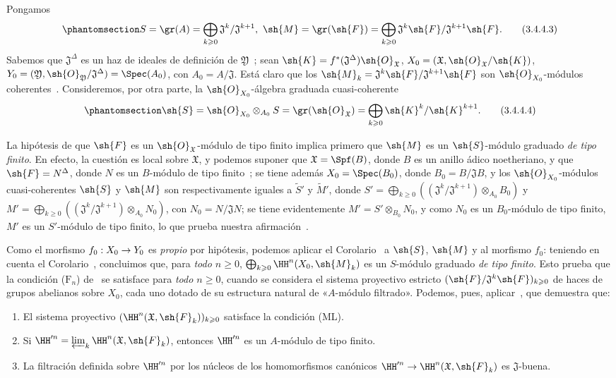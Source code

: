 \documentclass[oneside]{amsart}
\makeatletter
\renewcommand{\geq}{\geqslant}
\newcommand{\ega@arrow}[2]{\mathchoice{#1}{#2}{#2}{#2}}
\renewcommand{\to}{\ega@arrow{\longrightarrow}{\rightarrow}}
\newcommand{\oldpage}[2][]{{\marginnote{\normalfont\textbf{#1}~|~#2}}\ignorespaces}
\let\EGAOriginalLabel\label
\renewcommand{\label}[1]{\phantomsection\EGAOriginalLabel{#1}}
\makeatother
\begin{document}
Pongamos
\[
\label{III.3.4.4.3}
  S=\gr(A)=\bigoplus_{k\geq 0}\mathfrak{J}^k/\mathfrak{J}^{k+1},\ \sh{M}=\gr(\sh{F})=\bigoplus_{k\geq 0}\mathfrak{J}^k\sh{F}/\mathfrak{J}^{k+1}\sh{F}. \tag{3.4.4.3}
\]
Sabemos que $\mathfrak{J}^\Delta$ es un haz de ideales de definición de $\mathfrak{Y}$~; sean $\sh{K}=f^*(\mathfrak{J}^\Delta)\sh{O}_\mathfrak{X}$, $X_0=(\mathfrak{X},\sh{O}_\mathfrak{X}/\sh{K})$, $Y_0=(\mathfrak{Y},\sh{O}_\mathfrak{Y}/\mathfrak{J}^\Delta)=\Spec(A_0)$, con $A_0=A/\mathfrak{J}$.
Está claro que los $\sh{M}_k=\mathfrak{J}^k\sh{F}/\mathfrak{J}^{k+1}\sh{F}$ son $\sh{O}_{X_0}$-módulos coherentes~.
Consideremos, por otra parte, la $\sh{O}_{X_0}$-álgebra graduada cuasi-coherente
\[
\label{III.3.4.4.4}
  \sh{S}=\sh{O}_{X_0}\otimes_{A_0}S=\gr(\sh{O}_\mathfrak{X})=\bigoplus_{k\geq 0}\sh{K}^k/\sh{K}^{k+1}.
  \tag{3.4.4.4}
\]

La hipótesis de que $\sh{F}$ es un $\sh{O}_\mathfrak{X}$-módulo de tipo finito implica primero que $\sh{M}$ es
\oldpage[III]{121}
un $\sh{S}$-módulo graduado \emph{de tipo finito}.
En efecto, la cuestión es local sobre $\mathfrak{X}$, y podemos suponer que $\mathfrak{X}=\Spf(B)$, donde $B$ es un anillo ádico noetheriano, y que $\sh{F}=N^\Delta$, donde $N$ es un $B$-módulo de tipo finito~; se tiene además $X_0=\Spec(B_0)$, donde $B_0=B/\mathfrak{J}B$, y los $\sh{O}_{X_0}$-módulos cuasi-coherentes $\sh{S}$ y $\sh{M}$ son respectivamente iguales a $\widetilde S'$ y $\widetilde M'$, donde $S'=\bigoplus_{k\geq 0}((\mathfrak{J}^k/\mathfrak{J}^{k+1})\otimes_{A_0}B_0)$ y $M'=\bigoplus_{k\geq 0}((\mathfrak{J}^k/\mathfrak{J}^{k+1})\otimes_{A_0}N_0)$, con $N_0=N/\mathfrak{J}N$; se tiene evidentemente $M'=S'\otimes_{B_0}N_0$, y como $N_0$ es un $B_0$-módulo de tipo finito, $M'$ es un $S'$-módulo de tipo finito, lo que prueba nuestra afirmación~.

Como el morfismo $f_0:X_0\to Y_0$ es \emph{propio} por hipótesis, podemos aplicar el Corolario~ a $\sh{S}$, $\sh{M}$ y al morfismo $f_0$: teniendo en cuenta el Corolario~, concluimos que, para \emph{todo $n\geq 0$}, $\bigoplus_{k\geq 0}\HH^n(X_0,\sh{M}_k)$ es un $S$-módulo graduado \emph{de tipo finito}.
Esto prueba que la condición ($\text{F}_n$) de~ se satisface para \emph{todo $n\geq 0$}, cuando se considera el sistema proyectivo estricto $(\sh{F}/\mathfrak{J}^k\sh{F})_{k\geq 0}$ de haces de grupos abelianos sobre $X_0$, cada uno dotado de su estructura natural de «$A$-módulo filtrado».
Podemos, pues, aplicar~, que demuestra que:
\begin{enumerate}
  \item[1.º] El sistema proyectivo $(\HH^n(\mathfrak{X},\sh{F}_k))_{k\geq 0}$ satisface la condición (ML).
  \item[2.º] Si $\HH^{\prime n}=\varprojlim_k\HH^n(\mathfrak{X},\sh{F}_k)$, entonces $\HH^{\prime n}$ es un $A$-módulo de tipo finito.
  \item[3.º] La filtración definida sobre $\HH^{\prime n}$ por los núcleos de los homomorfismos canónicos $\HH^{\prime n}\to\HH^n(\mathfrak{X},\sh{F}_k)$ es $\mathfrak{J}$-buena.
\end{enumerate}
\end{document}
